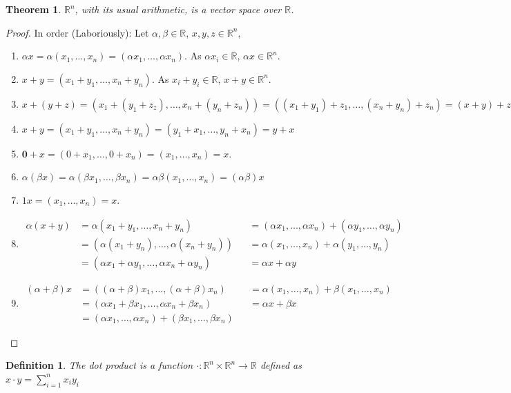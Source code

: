 \documentclass[oneside]{book}
\theoremstyle{mystyle}
\newtheorem{theorem}{Theorem}[section]
\newtheorem{definition}{Definition}[section]
\begin{document}
\begin{theorem}
$\mathbb{R}^n$, with its usual arithmetic, is a vector space over $\mathbb{R}$.
\end{theorem}
\begin{proof}
In order (Laboriously): Let $\alpha, \beta \in \mathbb{R}$, $x,y,z\in \mathbb{R}^n$,
\begin{enumerate}
\item $\alpha x = \alpha(x_1,\hdots,x_n) = (\alpha x_1,\hdots, \alpha x_n)$. As $\alpha x_i \in \mathbb{R}$, $\alpha x \in \mathbb{R}^n$.
\item $x+y = (x_1+y_1,\hdots,x_n+y_n)$. As $x_i+y_i \in \mathbb{R}$, $x+y\in \mathbb{R}^n$.
\item $x+(y+z) = (x_1+(y_1+z_z),\hdots, x_n+(y_n+z_n)) = ((x_1+y_1)+z_1,\hdots, (x_n+y_n)+z_n) = (x+y)+z$
\item $x+y = (x_1+y_1,\hdots,x_n+y_n) = (y_1+x_1,\hdots, y_n+x_n)=y+x$
\item $\mathbf{0}+x = (0+x_1,\hdots, 0+x_n) = (x_1,\hdots, x_n) = x$.
\item $\alpha(\beta x) = \alpha(\beta x_1,\hdots, \beta x_n) = \alpha \beta (x_1,\hdots, x_n) = (\alpha \beta) x$
\item $1 x = (x_1,\hdots, x_n) = x$.
\item
    \begin{align*}
        \alpha(x+y) &= \alpha(x_1+y_1,\hdots, x_n+y_n) & &= (\alpha x_1, \hdots, \alpha x_n) + (\alpha y_1,\hdots, \alpha y_n)\\
        &= (\alpha(x_1+y_n),\hdots, \alpha(x_n+y_n)) & &= \alpha(x_1,\hdots, x_n)+\alpha(y_1,\hdots, y_n)\\
        &= (\alpha x_1+\alpha y_1,\hdots, \alpha x_n + \alpha y_n) & &= \alpha x + \alpha y
    \end{align*} 
\item
    \begin{align*}
        (\alpha + \beta)x &= ((\alpha+\beta)x_1,\hdots, (\alpha+\beta)x_n) & &= \alpha (x_1, \hdots, x_n)+\beta (x_1, \hdots, x_n)\\
        &= (\alpha x_1 + \beta x_1,\hdots, \alpha x_n + \beta x_n) & &= \alpha x+\beta x\\
        &= (\alpha x_1,\hdots, \alpha x_n) + (\beta x_1,\hdots, \beta x_n)
    \end{align*}
\end{enumerate}
\end{proof}

\begin{definition}
The dot product is a function $\cdot:\mathbb{R}^n \times \mathbb{R}^n \rightarrow \mathbb{R}$ defined as $x\cdot y = \sum_{i=1}^{n} x_iy_i$
\end{definition}
\end{document}
